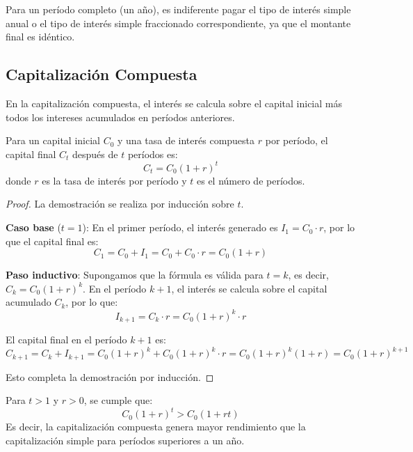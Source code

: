 \begin{proposicion}
Para un período completo (un año), es indiferente pagar el tipo de interés simple anual o el tipo de interés simple fraccionado correspondiente, ya que el montante final es idéntico.
\end{proposicion}

\subsection{Capitalización Compuesta}

En la capitalización compuesta, el interés se calcula sobre el capital inicial más todos los intereses acumulados en períodos anteriores.

\begin{teorema}
Para un capital inicial $C_0$ y una tasa de interés compuesta $r$ por período, el capital final $C_t$ después de $t$ períodos es:
\begin{equation}
C_t = C_0(1 + r)^t
\end{equation}
donde $r$ es la tasa de interés por período y $t$ es el número de períodos.
\end{teorema}

\begin{center}
    
\end{center}


\begin{proof}
La demostración se realiza por inducción sobre $t$.

\textbf{Caso base} ($t = 1$): En el primer período, el interés generado es $I_1 = C_0 \cdot r$, por lo que el capital final es:
$$C_1 = C_0 + I_1 = C_0 + C_0 \cdot r = C_0(1 + r)$$

\textbf{Paso inductivo}: Supongamos que la fórmula es válida para $t = k$, es decir, $C_k = C_0(1 + r)^k$. En el período $k+1$, el interés se calcula sobre el capital acumulado $C_k$, por lo que:
$$I_{k+1} = C_k \cdot r = C_0(1 + r)^k \cdot r$$

El capital final en el período $k+1$ es:
$$C_{k+1} = C_k + I_{k+1} = C_0(1 + r)^k + C_0(1 + r)^k \cdot r = C_0(1 + r)^k(1 + r) = C_0(1 + r)^{k+1}$$

Esto completa la demostración por inducción.
\end{proof}

\begin{proposicion}
Para $t > 1$ y $r > 0$, se cumple que:
\begin{equation}
C_0(1 + r)^t > C_0(1 + rt)
\end{equation}
Es decir, la capitalización compuesta genera mayor rendimiento que la capitalización simple para períodos superiores a un año.
\end{proposicion}

